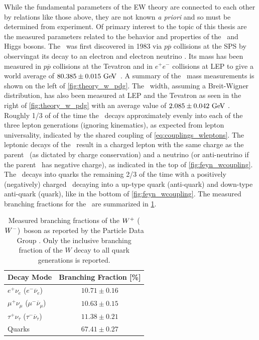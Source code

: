 While the fundamental parameters of the EW theory are connected to each other
by relations like those above, they are not known \emph{a priori} 
and so must be determined from experiment.
Of primary interest to the topic of this thesis 
are the measured parameters related to the behavior and properties
of the \dubya~and Higgs bosons.
The \dubya~was first discovered in 1983 via $p\overline{p}$ collisions
at the SPS by observingat its decay to an electron %
and electron neutrino \cite{ARNISON1983103}.
Its mass has been measured in $p\overline{p}$ collisions at the Tevatron
and in $e^{+}e^{-}$ collisions at LEP to give a world 
average of $80.385 \pm 0.015\GeV$~\cite{PDG:2014}.
A summary of the \dubya~mass measurements is shown on 
the left of \fig\ref{fig:theory_w_pdg}.
The \dubya~width, assuming a Breit-Wigner distribution, has also been measured 
at LEP and the Tevatron as seen in the right of \fig\ref{fig:theory_w_pdg}
with an average value of $2.085\pm0.042\GeV$ \cite{PDG:2014}.
Roughly 1/3 of of the time the \dubya~decays approximately 
evenly into each of the three lepton generations (ignoring kinematics),
as expected from lepton universality,  
indicated by the shared coupling of \eqn\eqref{eq:couplings_wleptons}.
The leptonic decays of the \dubya~result in a charged lepton 
with the same charge as the parent \dubya~(as dictated by charge conservation)
and a neutrino (or anti-neutrino if the parent \dubya~has negative charge),
as indicated in the top of \fig\ref{fig:feyn_wcoupling}.
The \dubya~decays into quarks the remaining 2/3 of the time with a positively
(negatively) charged \dubya~decaying into a up-type quark (anti-quark) 
and down-type anti-quark (quark),
like in the bottom of \fig\ref{fig:feyn_wcoupling}.
The measured branching fractions for the \dubya~are 
summarized in \tab\ref{tab:theory_wdecay}.

\begin{table}[ht]
\centering
\begin{tabular}{l|c}
Decay Mode &  Branching Fraction [\%]\\
\hline
$e^+\nu_e$ ($e^-\overline{\nu}_e$) & $10.71 \pm 0.16$ \\
$\mu^+\nu_{\mu}$ ($\mu^-\overline{\nu}_{\mu}$) & $10.63 \pm 0.15$\\
$\tau^+\nu_{\tau}$ ($\tau^-\overline{\nu}_{\tau}$) & $11.38 \pm 0.21$\\
Quarks & $67.41 \pm 0.27$\\
\end{tabular}
\caption{Measured branching fractions of the $W^+$ ($W^-$)~boson 
as reported by the Particle Data Group \cite{PDG:2014}. 
Only the inclusive branching fraction of the $W$ decay to all quark generations
is reported. }
\label{tab:theory_wdecay}
\end{table}


